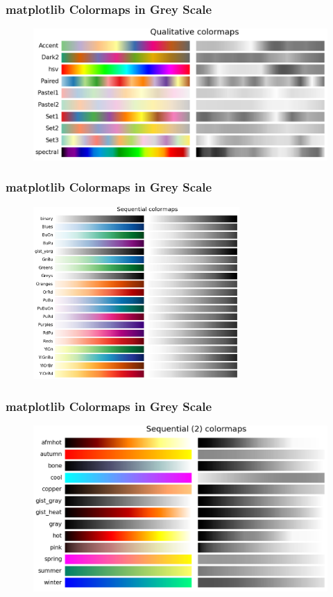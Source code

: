 \documentclass[ignorenonframetext]{beamer}
\begin{document}
\begin{frame}[t,noframenumbering]\frametitle{matplotlib Colormaps in Grey Scale}
    \begin{figure}[htbp]
        \centering
        \includegraphics[width=\textwidth]{figures/bwQualitative}
    \end{figure}
\end{frame}
\begin{frame}[t,noframenumbering]\frametitle{matplotlib Colormaps in Grey Scale}
    \begin{figure}[htbp]
        \centering
        \includegraphics[width=0.7\textwidth]{figures/bwSequential}
    \end{figure}
\end{frame}
\begin{frame}[t,noframenumbering]\frametitle{matplotlib Colormaps in Grey Scale}
    \begin{figure}[htbp]
        \centering
        \includegraphics[width=\textwidth]{figures/bwSequential2}
    \end{figure}
\end{frame}
\end{document}
